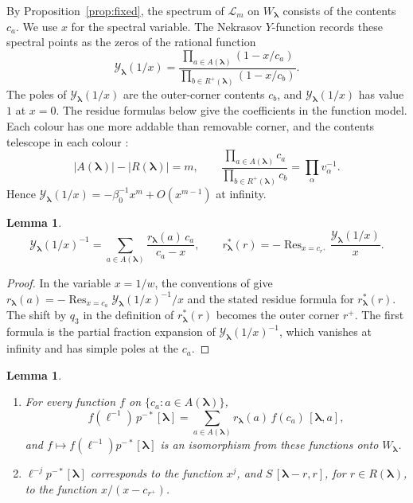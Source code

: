 \documentclass[11pt]{amsart}
\newtheorem{lemma}[theorem]{Lemma}
\theoremstyle{definition}
\theoremstyle{remark}
\newcommand{\betaz}{\beta_0}                     %
\newcommand{\bl}{{\boldsymbol{\lambda}}}         %
\newcommand{\Add}[1]{A(#1)}                      %
\newcommand{\Rem}[1]{R(#1)}                      %
\newcommand{\CY}{\mathcal Y}
\newcommand{\Yfn}[1]{\CY_{#1}}                   %
\newcommand{\res}[2]{r_{#1}(#2)}                 %
\newcommand{\cores}[2]{r^*_{#1}(#2)}             %
\newcommand{\ceig}[1]{c_{#1}}                    %
\newcommand{\bplus}[1]{{#1}^{+}}                 %
\newcommand{\Remp}[1]{R^{+}(#1)}                 %
\newcommand{\Wfib}[1]{W_{#1}}                    %
\newcommand{\fix}[1]{[#1]}                       %
\newcommand{\pt}[2]{[#1,#2]}                     %
\newcommand{\taut}{\ell}                         %
\newcommand{\pulm}{p^{-*}}                       %
\newcommand{\Shift}{S}                           %
\newcommand{\GLax}[1]{\mathcal L_{#1}}           %
\DeclareMathOperator{\Res}{Res}
\begin{document}
By Proposition~\ref{prop:fixed}, the spectrum of \(\GLax{m}\) on \(\Wfib{\bl}\)
consists of the contents \(\ceig{a}\). We use \(x\) for the spectral variable.
The Nekrasov \(Y\)-function records these spectral points as the zeros of the
rational function
\[
 \Yfn{\bl}(1/x)=\frac{\prod_{a\in\Add{\bl}}(1-x/\ceig{a})}
                   {\prod_{b\in\Remp{\bl}}(1-x/\ceig{b})}.
\]
The poles of \(\Yfn{\bl}(1/x)\) are the outer-corner contents \(\ceig{b}\), and
\(\Yfn{\bl}(1/x)\) has value \(1\) at \(x=0\).
The residue formulas below give the coefficients in the function model.
Each colour has one more addable than removable corner, and the contents
telescope in each colour \cite{BCS}:
\begin{equation}\label{eq:cornerproducts}
 |\Add{\bl}|-|\Rem{\bl}|=m,\qquad
 \frac{\prod_{a\in\Add{\bl}}\ceig{a}}{\prod_{b\in\Remp{\bl}}\ceig{b}}
 =\prod_\alpha v_\alpha^{-1}.
\end{equation}
Hence \(\Yfn{\bl}(1/x)=-\betaz^{-1}x^m+O(x^{m-1})\) at infinity.

\begin{lemma}\label{lem:residues}
\[
 \Yfn{\bl}(1/x)^{-1}=\sum_{a\in\Add{\bl}}\frac{\res{\bl}{a}\,\ceig{a}}{\ceig{a}-x},
 \qquad
 \cores{\bl}{r}=-\Res_{x=\ceig{\bplus{r}}}\frac{\Yfn{\bl}(1/x)}{x}.
\]
\end{lemma}

\begin{proof}
In the variable \(x=1/w\), the conventions of \cite{BCS} give
\(\res{\bl}{a}=-\Res_{x=\ceig{a}}\Yfn{\bl}(1/x)^{-1}/x\) and the stated
residue formula for \(\cores{\bl}{r}\).
The shift by \(q_3\) in the definition of \(\cores{\bl}{r}\) becomes the outer
corner \(\bplus{r}\). The first formula is the partial fraction expansion of
\(\Yfn{\bl}(1/x)^{-1}\), which vanishes at infinity and has simple poles at the
\(\ceig{a}\).
\end{proof}

\begin{lemma}\label{lem:fibre}
\begin{enumerate}
\item[(i)] For every function \(f\) on \(\{\ceig{a}:a\in\Add{\bl}\}\),
\[
 f(\taut^{-1})\,\pulm\fix{\bl}
 =\sum_{a\in\Add{\bl}}\res{\bl}{a}\,f(\ceig{a})\,\pt{\bl}{a},
\]
and \(f\mapsto f(\taut^{-1})\pulm\fix{\bl}\) is an isomorphism from these
functions onto \(\Wfib{\bl}\).
\item[(ii)] \(\taut^{-j}\pulm\fix{\bl}\) corresponds to the function \(x^j\),
and \(\Shift\,\pt{\bl-r}{r}\), for \(r\in\Rem{\bl}\), to the function
\(x/(x-\ceig{\bplus{r}})\).
\end{enumerate}
\end{lemma}
\end{document}
